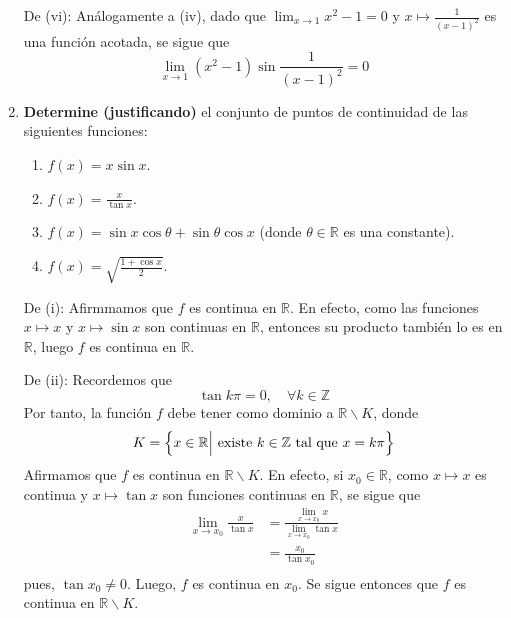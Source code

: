 \documentclass[12pt]{article}
\begin{document}
\begin{enumerate}
\begin{sol}
        De (vi): Análogamente a (iv), dado que $\lim_{ x\rightarrow 1}x^2-1=0$ y $x\mapsto\frac{1}{(x-1)^2}$ es una función acotada, se sigue que
        \begin{equation*}
            \lim_{ x\rightarrow 1}(x^2-1)\sin\frac{1}{(x-1)^2}=0
        \end{equation*}
    \end{sol}

    \item \textbf{Determine (justificando)} el conjunto de puntos de continuidad de las siguientes funciones:
    \begin{enumerate}
        \item $f(x)=x\sin x$.
        \item $f(x)=\frac{x}{\tan x}$.
        \item $f(x)=\sin x\cos\theta+\sin\theta\cos x$ (donde $\theta\in\mathbb{R}$ es una constante).
        \item $f(x)=\sqrt{\frac{1+\cos x}{2}}$.
    \end{enumerate}

    \begin{sol}
        De (i): Afirmmamos que $f$ es continua en $\mathbb{R}$. En efecto, como las funciones $x\mapsto x$ y $x\mapsto \sin x$ son continuas en $\mathbb{R}$, entonces su producto también lo es en $\mathbb{R}$, luego $f$ es continua en $\mathbb{R}$.

        De (ii): Recordemos que
        \begin{equation*}
            \tan k\pi=0,\quad\forall k\in\mathbb{Z}
        \end{equation*}
        Por tanto, la función $f$ debe tener como dominio a $\mathbb{R}\backslash K$, donde
        \begin{equation*}
            K=\left\{x\in\mathbb{R}\Big|\textup{ existe }k\in\mathbb{Z}\textup{ tal que }x=k\pi \right\}
        \end{equation*}
        Afirmamos que $f$ es continua en $\mathbb{R}\backslash K$. En efecto, si $x_0\in\mathbb{R}$, como $x\mapsto x$ es continua y $x\mapsto \tan x$ son funciones continuas en $\mathbb{R}$, se sigue que
        \begin{equation*}
            \begin{split}
                \lim_{ x\rightarrow x_0}\frac{x}{\tan x}&=\frac{\lim_{ x\rightarrow x_0}x}{\lim_{ x\rightarrow x_0}\tan x}\\
                &=\frac{x_0}{\tan x_0}\\
            \end{split}
        \end{equation*}
        pues, $\tan x_0\neq 0$. Luego, $f$ es continua en $x_0$. Se sigue entonces que $f$ es continua en $\mathbb{R}\backslash K$.
        

\end{sol}
\end{enumerate}
\end{document}
